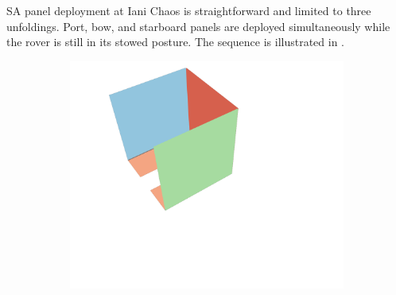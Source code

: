 \ac{SA} panel deployment at Iani Chaos is straightforward and limited to three unfoldings. Port, bow, and starboard panels are deployed simultaneously while the rover is still in its stowed posture. The sequence is illustrated in .

\vspace{0.5cm}

\begin{figure}[h]
\captionsetup[subfigure]{justification=centering}
\vspace{-2ex}
	\centering
    \setlength{\subfigureWidth}{0.32\textwidth}
    \setlength{\graphicsHeight}{30mm}
    \hypersetup{hidelinks=true}%
	\begin{subfigure}[t]{\subfigureWidth}
        \centering
		\includegraphics[height=\graphicsHeight]{sections/power-system-design/solar-array/images/deployment/iani-chaos/solar_array_deployment_iani_chaos_000.png}
		\label{fig:sub:deployment-sequence-iani-chaos-stowed}
	\end{subfigure}\hfill
	\begin{subfigure}[t]{\subfigureWidth}
        \centering

\end{subfigure}
\end{figure}
